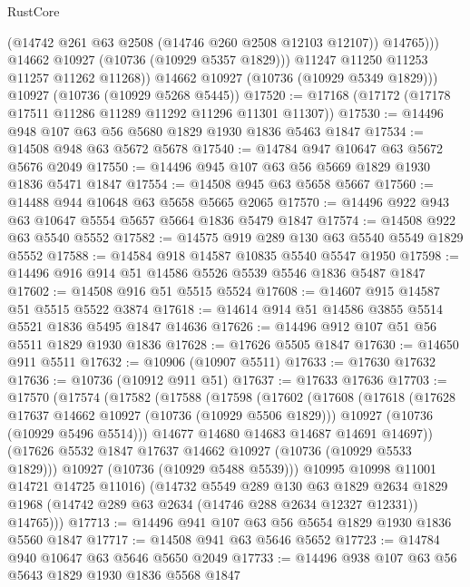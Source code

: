 \begin{lexlean}{RustCore}
\begin{coremodule}
                  (@14742 @261 @63 @2508 (@14746 @260 @2508 @12103 @12107))
                  @14765)))
            @14662
            @10927
            (@10736 (@10929 @5357 @1829)))
          @11247
          @11250
          @11253
          @11257
          @11262
          @11268))
      @14662
      @10927
      (@10736 (@10929 @5349 @1829)))
    @10927
    (@10736 (@10929 @5268 @5445))
@17520 := @17168 (@17172 (@17178 @17511 @11286 @11289 @11292 @11296 @11301 @11307))
@17530 := @14496 @948 @107 @63 @56 @5680 @1829 @1930 @1836 @5463 @1847
@17534 := @14508 @948 @63 @5672 @5678
@17540 := @14784 @947 @10647 @63 @5672 @5676 @2049
@17550 := @14496 @945 @107 @63 @56 @5669 @1829 @1930 @1836 @5471 @1847
@17554 := @14508 @945 @63 @5658 @5667
@17560 := @14488 @944 @10648 @63 @5658 @5665 @2065
@17570 := @14496 @922 @943 @63 @10647 @5554 @5657 @5664 @1836 @5479 @1847
@17574 := @14508 @922 @63 @5540 @5552
@17582 := @14575 @919 @289 @130 @63 @5540 @5549 @1829 @5552
@17588 := @14584 @918 @14587 @10835 @5540 @5547 @1950
@17598 := @14496 @916 @914 @51 @14586 @5526 @5539 @5546 @1836 @5487 @1847
@17602 := @14508 @916 @51 @5515 @5524
@17608 := @14607 @915 @14587 @51 @5515 @5522 @3874
@17618 := @14614 @914 @51 @14586 @3855 @5514 @5521 @1836 @5495 @1847 @14636
@17626 := @14496 @912 @107 @51 @56 @5511 @1829 @1930 @1836
@17628 := @17626 @5505 @1847
@17630 := @14650 @911 @5511
@17632 := @10906 (@10907 @5511)
@17633 := @17630 @17632
@17636 := @10736 (@10912 @911 @51)
@17637 := @17633 @17636
@17703 := @17570
    (@17574
      (@17582
        (@17588
          (@17598
            (@17602
              (@17608
                (@17618
                  (@17628 @17637 @14662 @10927 (@10736 (@10929 @5506 @1829)))
                  @10927
                  (@10736 (@10929 @5496 @5514)))
                @14677
                @14680
                @14683
                @14687
                @14691
                @14697))
            (@17626 @5532 @1847 @17637 @14662 @10927 (@10736 (@10929 @5533 @1829)))
            @10927
            (@10736 (@10929 @5488 @5539)))
          @10995
          @10998
          @11001
          @14721
          @14725
          @11016)
        (@14732
          @5549
          @289
          @130
          @63
          @1829
          @2634
          @1829
          @1968
          (@14742 @289 @63 @2634 (@14746 @288 @2634 @12327 @12331))
          @14765)))
@17713 := @14496 @941 @107 @63 @56 @5654 @1829 @1930 @1836 @5560 @1847
@17717 := @14508 @941 @63 @5646 @5652
@17723 := @14784 @940 @10647 @63 @5646 @5650 @2049
@17733 := @14496 @938 @107 @63 @56 @5643 @1829 @1930 @1836 @5568 @1847

\end{coremodule}
\end{lexlean}
